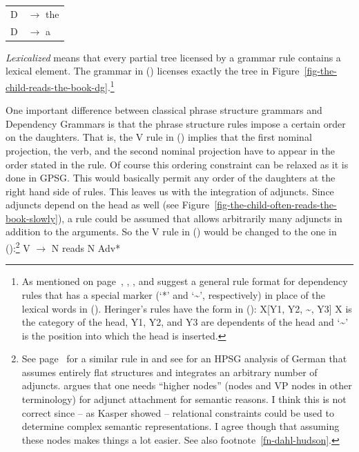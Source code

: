 \begin{tabular}[t]{@{}l@{ }l}
{D}  & {$\to$ the}\\
{D}  & {$\to$ a}\\
\end{tabular}
\z
\largerpage
\emph{Lexicalized}  means that every partial tree licensed by a grammar rule contains a lexical element.
The grammar in () licenses exactly the tree in
Figure~\ref{fig-the-child-reads-the-book-dg}.\footnote{\label{fn-flat-dg-rules}%
As mentioned on page~\pageref{page-rule-format-dg}, \citet[]{Gaifman65a}, \citet[]{Hays64a-u}, \citet[]{Baumgaertner70a} and \citet[]{Heringer96a-u} suggest a
general rule format for dependency rules that has a special marker (`*' and `\textasciitilde', respectively) in place of the lexical words in (). Heringer's rules have the
form in ():
\ea
X[Y1, Y2, \textasciitilde, Y3]
\z
X is the category of the head, Y1, Y2, and Y3 are dependents of the head and `\textasciitilde' is the position into
which the head is inserted.
}

One important difference between classical phrase structure grammars and Dependency Grammars is that the
phrase structure rules impose a certain order on the daughters. That is, the V rule in ()
implies that the first nominal projection, the verb, and the second nominal projection have to
appear in the order stated in the rule. Of course this ordering constraint can be relaxed as it is
done in GPSG. This would basically permit any order of the daughters at the right hand side of
rules.
This leaves us with the integration of adjuncts. Since adjuncts depend on the head as well (see
Figure~\ref{fig-the-child-often-reads-the-book-slowly}), a rule could be assumed that allows
arbitrarily many adjuncts in addition to the arguments. So the V rule in () would be changed
to the one in ():\footnote{%
  See page~\pageref{adv-metarule} for a similar rule in \gpsg and see \citet{Kasper94a} for an HPSG
analysis of German that assumes entirely flat structures and integrates an arbitrary number of
adjuncts. \citet{Dahl80a} argues that one needs ``higher nodes'' (\nbar nodes and VP nodes in other
terminology) for adjunct attachment for semantic reasons. I think this is not correct since -- as
Kasper showed -- relational constraints could be used to determine complex semantic representations. I agree though
that assuming these nodes makes things a lot easier. See also footnote~\ref{fn-dahl-hudson}.
}
\ea
V $\to$ N reads N Adv*
\z 

